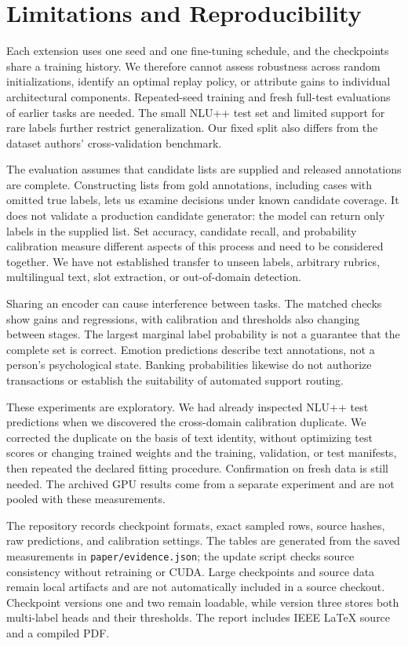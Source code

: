 \documentclass[conference]{IEEEtran}
\begin{document}
\section{Limitations and Reproducibility}
Each extension uses one seed and one fine-tuning schedule, and the checkpoints share a training history. We therefore cannot assess robustness across random initializations, identify an optimal replay policy, or attribute gains to individual architectural components. Repeated-seed training and fresh full-test evaluations of earlier tasks are needed. The small NLU++ test set and limited support for rare labels further restrict generalization. Our fixed split also differs from the dataset authors' cross-validation benchmark.

The evaluation assumes that candidate lists are supplied and released annotations are complete. Constructing lists from gold annotations, including cases with omitted true labels, lets us examine decisions under known candidate coverage. It does not validate a production candidate generator: the model can return only labels in the supplied list. Set accuracy, candidate recall, and probability calibration measure different aspects of this process and need to be considered together. We have not established transfer to unseen labels, arbitrary rubrics, multilingual text, slot extraction, or out-of-domain detection.

Sharing an encoder can cause interference between tasks. The matched checks show gains and regressions, with calibration and thresholds also changing between stages. The largest marginal label probability is not a guarantee that the complete set is correct. Emotion predictions describe text annotations, not a person's psychological state. Banking probabilities likewise do not authorize transactions or establish the suitability of automated support routing.

These experiments are exploratory. We had already inspected NLU++ test predictions when we discovered the cross-domain calibration duplicate. We corrected the duplicate on the basis of text identity, without optimizing test scores or changing trained weights and the training, validation, or test manifests, then repeated the declared fitting procedure. Confirmation on fresh data is still needed. The archived GPU results come from a separate experiment and are not pooled with these measurements.

The repository records checkpoint formats, exact sampled rows, source hashes, raw predictions, and calibration settings. The tables are generated from the saved measurements in \texttt{paper/evidence.json}; the update script checks source consistency without retraining or CUDA. Large checkpoints and source data remain local artifacts and are not automatically included in a source checkout. Checkpoint versions one and two remain loadable, while version three stores both multi-label heads and their thresholds. The report includes IEEE LaTeX source and a compiled PDF.
\end{document}
